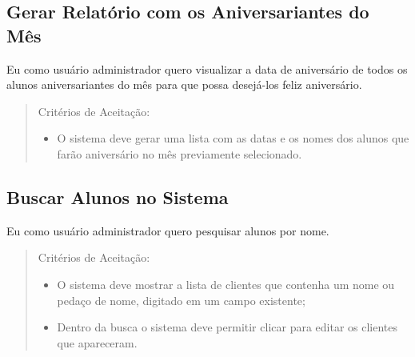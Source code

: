 \subsection[Gerar Relatório com os Aniversariantes do Mês]{Gerar Relatório com os Aniversariantes do Mês}
Eu como usuário administrador quero visualizar a data de aniversário de todos os
alunos aniversariantes do mês para que possa desejá-los feliz aniversário.

\begin{quote}
Critérios de Aceitação:
    \begin{itemize}
        \item O sistema deve gerar uma lista com as datas e os nomes dos alunos que farão aniversário no mês previamente selecionado.
    \end{itemize}
\end{quote}

\subsection[Buscar Alunos no Sistema]{Buscar Alunos no Sistema}
Eu como usuário administrador quero pesquisar alunos por nome.

\begin{quote}
Critérios de Aceitação:
    \begin{itemize}
        \item O sistema deve mostrar a lista de clientes que contenha um nome ou pedaço de
        nome, digitado em um campo existente;
        \item Dentro da busca o sistema deve permitir clicar para editar os clientes que
        apareceram.
    \end{itemize}
\end{quote}
